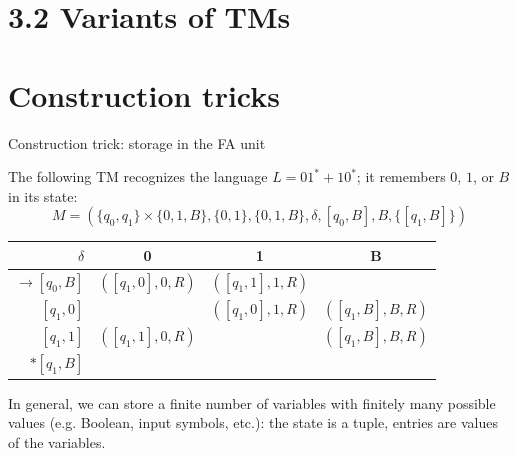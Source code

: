 \documentclass[handout]{beamer}
\begin{document}
\section{3.2 Variants of TMs}


\section*{Construction tricks}


\begin{frame}{Construction trick: storage in the FA unit}

    The following TM recognizes the language $L=01^*+10^*$; it remembers $0$, $1$, or $B$ in its state:
    $$
    M=(\{q_0,q_1\}\times\{0,1,B\},\{0,1\},\{0,1,B\},\delta,[q_0,B],B,\{[q_1,B]\})
    $$
    \begin{center}
        \begin{tabular}{r |c |c |c }
        $\delta$ & 0 & 1 & B \\
        \hline\hline
        $\rightarrow[q_0,B]$& $([q_1,0],0,R)$& $([q_1,1],1,R)$& \\
        $[q_1,0]$& & $([q_1,0],1,R)$& $([q_1,B],B,R)$ \\
        $[q_1,1]$& $([q_1,1],0,R)$& &$([q_1,B],B,R)$ \\
        $*[q_1,B]$ & & &
        \end{tabular}
    \end{center}

    In general, we can store a finite number of variables with finitely many possible values (e.g. Boolean, input symbols, etc.): the state is a tuple, entries are values of the variables.
    
\end{frame}
\end{document}
